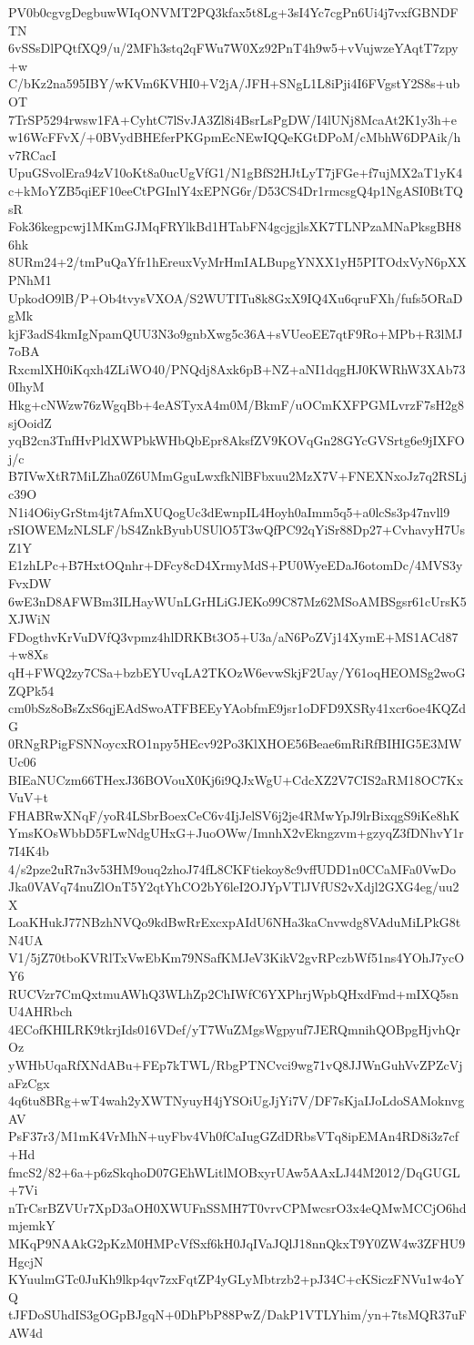 PV0b0cgvgDegbuwWIqONVMT2PQ3kfax5t8Lg+3sI4Yc7cgPn6Ui4j7vxfGBNDFTN
6vSSsDlPQtfXQ9/u/2MFh3stq2qFWu7W0Xz92PnT4h9w5+vVujwzeYAqtT7zpy+w
C/bKz2na595IBY/wKVm6KVHI0+V2jA/JFH+SNgL1L8iPji4I6FVgstY2S8s+ubOT
7TrSP5294rwsw1FA+CyhtC7lSvJA3Zl8i4BsrLsPgDW/I4lUNj8McaAt2K1y3h+e
w16WcFFvX/+0BVydBHEferPKGpmEcNEwIQQeKGtDPoM/cMbhW6DPAik/hv7RCacI
UpuGSvolEra94zV10oKt8a0ucUgVfG1/N1gBfS2HJtLyT7jFGe+f7ujMX2aT1yK4
c+kMoYZB5qiEF10eeCtPGInlY4xEPNG6r/D53CS4Dr1rmcsgQ4p1NgASI0BtTQsR
Fok36kegpcwj1MKmGJMqFRYlkBd1HTabFN4gcjgjlsXK7TLNPzaMNaPksgBH86hk
8URm24+2/tmPuQaYfr1hEreuxVyMrHmIALBupgYNXX1yH5PITOdxVyN6pXXPNhM1
UpkodO9lB/P+Ob4tvysVXOA/S2WUTITu8k8GxX9IQ4Xu6qruFXh/fufs5ORaDgMk
kjF3adS4kmIgNpamQUU3N3o9gnbXwg5c36A+sVUeoEE7qtF9Ro+MPb+R3lMJ7oBA
RxcmlXH0iKqxh4ZLiWO40/PNQdj8Axk6pB+NZ+aNI1dqgHJ0KWRhW3XAb730IhyM
Hkg+cNWzw76zWgqBb+4eASTyxA4m0M/BkmF/uOCmKXFPGMLvrzF7sH2g8sjOoidZ
yqB2cn3TnfHvPldXWPbkWHbQbEpr8AksfZV9KOVqGn28GYcGVSrtg6e9jIXFOj/c
B7IVwXtR7MiLZha0Z6UMmGguLwxfkNlBFbxuu2MzX7V+FNEXNxoJz7q2RSLjc39O
N1i4O6iyGrStm4jt7AfmXUQogUc3dEwnpIL4Hoyh0aImm5q5+a0lcSs3p47nvll9
rSIOWEMzNLSLF/bS4ZnkByubUSUlO5T3wQfPC92qYiSr88Dp27+CvhavyH7UsZ1Y
E1zhLPc+B7HxtOQnhr+DFcy8cD4XrmyMdS+PU0WyeEDaJ6otomDc/4MVS3yFvxDW
6wE3nD8AFWBm3ILHayWUnLGrHLiGJEKo99C87Mz62MSoAMBSgsr61cUrsK5XJWiN
FDogthvKrVuDVfQ3vpmz4hlDRKBt3O5+U3a/aN6PoZVj14XymE+MS1ACd87+w8Xs
qH+FWQ2zy7CSa+bzbEYUvqLA2TKOzW6evwSkjF2Uay/Y61oqHEOMSg2woGZQPk54
cm0bSz8oBsZxS6qjEAdSwoATFBEEyYAobfmE9jsr1oDFD9XSRy41xcr6oe4KQZdG
0RNgRPigFSNNoycxRO1npy5HEcv92Po3KlXHOE56Beae6mRiRfBIHIG5E3MWUc06
BIEaNUCzm66THexJ36BOVouX0Kj6i9QJxWgU+CdcXZ2V7CIS2aRM18OC7KxVuV+t
FHABRwXNqF/yoR4LSbrBoexCeC6v4IjJelSV6j2je4RMwYpJ9lrBixqgS9iKe8hK
YmsKOsWbbD5FLwNdgUHxG+JuoOWw/ImnhX2vEkngzvm+gzyqZ3fDNhvY1r7I4K4b
4/s2pze2uR7n3v53HM9ouq2zhoJ74fL8CKFtiekoy8c9vffUDD1n0CCaMFa0VwDo
Jka0VAVq74nuZlOnT5Y2qtYhCO2bY6leI2OJYpVTlJVfUS2vXdjl2GXG4eg/uu2X
LoaKHukJ77NBzhNVQo9kdBwRrExcxpAIdU6NHa3kaCnvwdg8VAduMiLPkG8tN4UA
V1/5jZ70tboKVRlTxVwEbKm79NSafKMJeV3KikV2gvRPczbWf51ns4YOhJ7ycOY6
RUCVzr7CmQxtmuAWhQ3WLhZp2ChIWfC6YXPhrjWpbQHxdFmd+mIXQ5snU4AHRbch
4ECofKHILRK9tkrjIds016VDef/yT7WuZMgsWgpyuf7JERQmnihQOBpgHjvhQrOz
yWHbUqaRfXNdABu+FEp7kTWL/RbgPTNCvci9wg71vQ8JJWnGuhVvZPZcVjaFzCgx
4q6tu8BRg+wT4wah2yXWTNyuyH4jYSOiUgJjYi7V/DF7sKjaIJoLdoSAMoknvgAV
PsF37r3/M1mK4VrMhN+uyFbv4Vh0fCaIugGZdDRbsVTq8ipEMAn4RD8i3z7cf+Hd
fmcS2/82+6a+p6zSkqhoD07GEhWLitlMOBxyrUAw5AAxLJ44M2012/DqGUGL+7Vi
nTrCsrBZVUr7XpD3aOH0XWUFnSSMH7T0vrvCPMwcsrO3x4eQMwMCCjO6hdmjemkY
MKqP9NAAkG2pKzM0HMPcVfSxf6kH0JqIVaJQlJ18nnQkxT9Y0ZW4w3ZFHU9HgcjN
KYuulmGTc0JuKh9lkp4qv7zxFqtZP4yGLyMbtrzb2+pJ34C+cKSiczFNVu1w4oYQ
tJFDoSUhdIS3gOGpBJgqN+0DhPbP88PwZ/DakP1VTLYhim/yn+7tsMQR37uFAW4d
